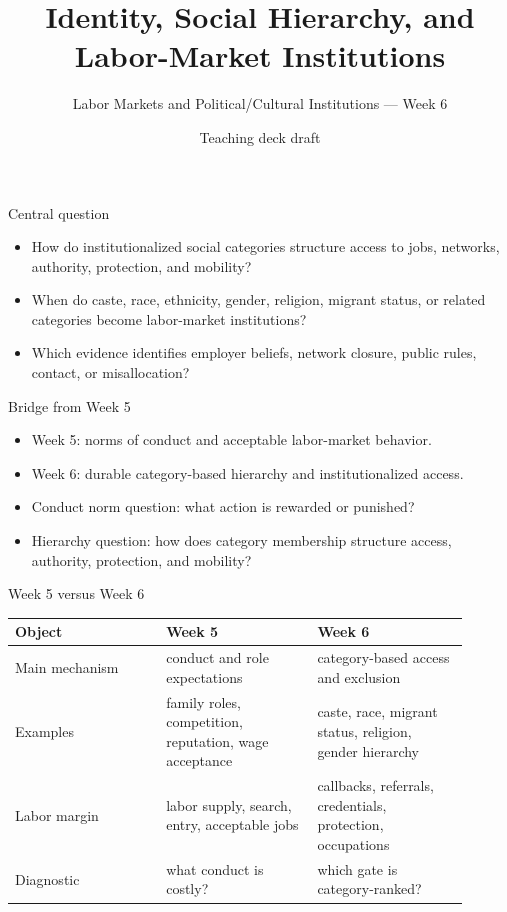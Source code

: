 \documentclass[aspectratio=169,11pt]{beamer}
\title{Identity, Social Hierarchy, and Labor-Market Institutions}
\subtitle{Labor Markets and Political/Cultural Institutions --- Week 6}
\author{Teaching deck draft}
\date{}
\begin{document}
\begin{frame}
  \titlepage
\end{frame}

\begin{frame}{Central question}
\begin{itemize}
    \item How do institutionalized social categories structure access to jobs, networks, authority, protection, and mobility?
    \item When do caste, race, ethnicity, gender, religion, migrant status, or related categories become labor-market institutions?
    \item Which evidence identifies employer beliefs, network closure, public rules, contact, or misallocation?
\end{itemize}
\end{frame}

\begin{frame}{Bridge from Week 5}
\begin{itemize}
    \item Week 5: norms of conduct and acceptable labor-market behavior.
    \item Week 6: durable category-based hierarchy and institutionalized access.
    \item Conduct norm question: what action is rewarded or punished?
    \item Hierarchy question: how does category membership structure access, authority, protection, and mobility?
\end{itemize}
\end{frame}

\begin{frame}{Week 5 versus Week 6}
\small
\begin{tabular}{p{0.30\linewidth} p{0.30\linewidth} p{0.30\linewidth}}
\toprule
Object & Week 5 & Week 6 \\
\midrule
Main mechanism & conduct and role expectations & category-based access and exclusion \\
Examples & family roles, competition, reputation, wage acceptance & caste, race, migrant status, religion, gender hierarchy \\
Labor margin & labor supply, search, entry, acceptable jobs & callbacks, referrals, credentials, protection, occupations \\
Diagnostic & what conduct is costly? & which gate is category-ranked? \\
\bottomrule
\end{tabular}
\end{frame}
\end{document}
